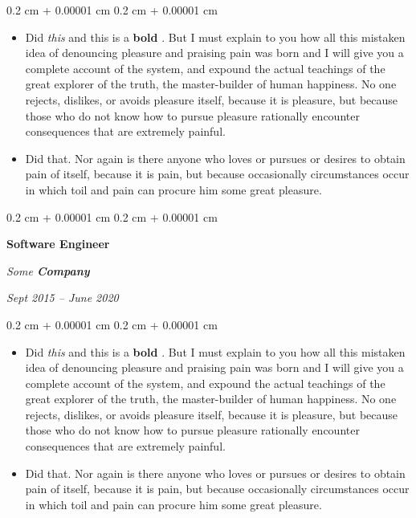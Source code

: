 \documentclass[10pt, letterpaper]{article}
\newenvironment{highlights}{
    \begin{itemize}[
        topsep=0.10 cm,
        parsep=0.10 cm,
        partopsep=0pt,
        itemsep=0pt,
        leftmargin=0.4 cm + 10pt
    ]
}{
    \end{itemize}
} %
\newenvironment{onecolentry}{
    \begin{adjustwidth}{
        0.2 cm + 0.00001 cm
    }{
        0.2 cm + 0.00001 cm
    }
}{
    \end{adjustwidth}
} %
\newenvironment{twocolentry}[2][]{
    \onecolentry
    \def\secondColumn{#2}
    \setcolumnwidth{\fill, 4.5 cm}
    \begin{paracol}{2}
}{
    \switchcolumn \raggedleft \secondColumn
    \end{paracol}
    \endonecolentry
} %
\let\hrefWithoutArrow\href
\renewcommand{\href}[2]{\hrefWithoutArrow{#1}{\ifthenelse{\equal{#2}{}}{ }{#2 }\raisebox{.15ex}{\footnotesize \faExternalLink*}}}
\begin{document}
        \vspace{0.10 cm}
        \begin{onecolentry}
            \begin{highlights}
                \item Did \textit{this} and this is a \textbf{bold} \href{https://example.com}{link}. But I must explain to you how all this mistaken idea of denouncing pleasure and praising pain was born and I will give you a complete account of the system, and expound the actual teachings of the great explorer of the truth, the master-builder of human happiness. No one rejects, dislikes, or avoids pleasure itself, because it is pleasure, but because those who do not know how to pursue pleasure rationally encounter consequences that are extremely painful.
                \item Did that. Nor again is there anyone who loves or pursues or desires to obtain pain of itself, because it is pain, but because occasionally circumstances occur in which toil and pain can procure him some great pleasure.
            \end{highlights}
        \end{onecolentry}


        \vspace{0.2 cm}

            \begin{twocolentry}{


        \textit{Sept 2015 – June 2020}    }
                \textbf{Software Engineer}

                \textit{Some \textbf{Company}}
            \end{twocolentry}

        \vspace{0.10 cm}
        \begin{onecolentry}
            \begin{highlights}
                \item Did \textit{this} and this is a \textbf{bold} \href{https://example.com}{link}. But I must explain to you how all this mistaken idea of denouncing pleasure and praising pain was born and I will give you a complete account of the system, and expound the actual teachings of the great explorer of the truth, the master-builder of human happiness. No one rejects, dislikes, or avoids pleasure itself, because it is pleasure, but because those who do not know how to pursue pleasure rationally encounter consequences that are extremely painful.
                \item Did that. Nor again is there anyone who loves or pursues or desires to obtain pain of itself, because it is pain, but because occasionally circumstances occur in which toil and pain can procure him some great pleasure.
            \end{highlights}
        \end{onecolentry}
\end{document}

